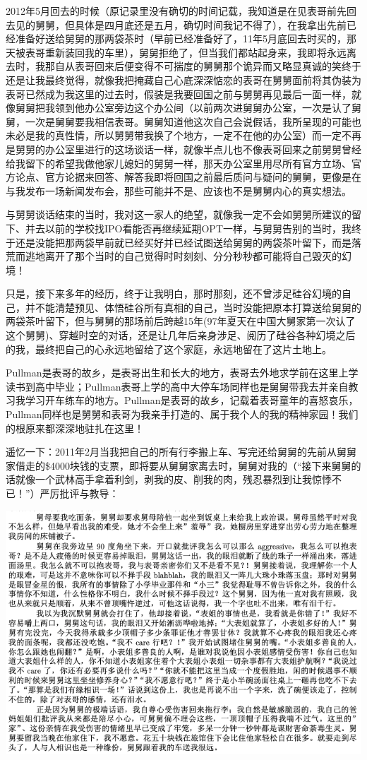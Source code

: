 \documentclass[9pt, b5paper]{article}
\begin{document}
2012年5月回去的时候（原记录里没有确切的时间记载，我知道是在见表哥前先回去见的舅舅，但具体是四月底还是五月，确切时间我记不得了），在我拿出先前已经准备好送给舅舅的那两袋茶时（早前已经准备好了，11年5月底回去时买的，那天被表哥重新装回我的车里），舅舅拒绝了，但当我们都站起身来，我即将永远离去时，我那自从表哥回来后便变得不可揣度的舅舅那个诡异而又略显真诚的笑终于还是让我最终觉得，就像我把掩藏自己心底深深惦恋的表哥在舅舅面前将其伪装为表哥已然成为我这里的过去时，假装是我要回国之前与舅舅再见最后一面一样，就像舅舅把我领到他办公室旁边这个办公间（以前两次进舅舅办公室，一次是认了舅舅，一次是舅舅要我相信表哥。舅舅知道他这次自己会说假话，我所呈现的可能也未必是我的真性情，所以舅舅带我换了个地方，一定不在他的办公室）而一定不再是舅舅的办公室里进行的这场谈话一样，就像半点儿也不像表哥回来之前舅舅曾经给我留下的希望我做他家儿媳妇的舅舅一样，那天办公室里用尽所有官方立场、官方论点、官方论据来回答、解答我即将回国之前最后质问与疑问的舅舅，更像是在与我发布一场新闻发布会，那些可能并不是、应该也不是舅舅内心的真实想法。

与舅舅谈话结束的当时，我对这一家人的绝望，就像我一定不会如舅舅所建议的留下、并去以前的学校找IPO看能否再继续延期OPT一样，与舅舅告别的当时，我终于还是没能把那两袋早前就已经买好并已经试图送给舅舅的两袋茶叶留下，而是落荒而逃地离开了那个当时的自己觉得时时刻刻、分分秒秒都可能将自己毁灭的幻境！

只是，接下来多年的经历，终于让我明白，那时那刻，还不曾涉足硅谷幻境的自己，并不能清楚预见、体悟硅谷所有真相的自己，当时没能把原本打算送给舅舅的两袋茶叶留下，但与舅舅的那场前后跨越15年(97年夏天在中国大舅家第一次认了这个舅舅)、穿越时空的对话，还是让几年后亲身涉足、阅历了硅谷各种幻境之后的我，最终把自己的心永远地留给了这个家庭，永远地留在了这片土地上。

Pullman是表哥的故乡，是表哥出生和长大的地方，表哥去外地求学前在这里上学读书到高中毕业；Pullman表哥上学的高中大停车场同样也是舅舅带我去并亲自教习我学习开车练车的地方。Pullman是表哥的故乡，记载着表哥童年的喜怒哀乐，Pullman同样也是舅舅和表哥为我亲手打造的、属于我个人的我的精神家园！我们的根原来都深深地驻扎在这里！

遥忆一下：2011年2月当我把自己的所有行李搬上车、写完还给舅舅的先前从舅舅家借走的\$4000块钱的支票，即将要从舅舅家离去时，舅舅对我的（“接下来舅舅的话就像一个武林高手拿着利剑，剥我的皮、削我的肉，残忍暴烈到让我惊悸不已！”）严厉批评与教导：

\begin{center}
\includegraphics[width=.9\linewidth]{./pic/p1p51.png}
\end{center}
\end{document}
